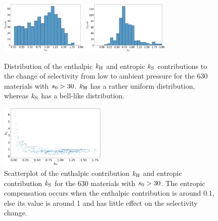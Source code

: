 \documentclass[main.tex]{subfiles}
\begin{document}
\begin{figure}[t]
  \centering
    \includegraphics[width=0.37\textwidth]{figures/2-thermo/k_H.jpg}
    \hspace{8mm}
    \includegraphics[width=0.37\textwidth]{figures/2-thermo/k_S.jpg}
    \caption{Distribution of the enthalpic $k_{\text{H}}$ and entropic $k_{\text{S}}$ contributions to the change of selectivity from low to ambient pressure for the 630 materials with $s_{\text{0}}>30$. $k_{\text{H}}$ has a rather uniform distribution, whereas $k_{\text{S}}$ has a bell-like distribution. }\label{fgr:distk}
\end{figure}

\begin{figure}[t]
\centering
  \includegraphics[width=0.45\textwidth]{figures/2-thermo/k_S_vs_k_H.jpg}
  \caption{Scatterplot of the enthalpic contribution $k_{\text{H}}$ and entropic contribution $k_{\text{S}}$ for the 630 materials with $s_{\text{0}}>30$. The entropic compensation occurs when the enthalpic contribution is around $0.1$, else its value is around 1 and has little effect on the selectivity change.}\label{fgr:scatterk}
\end{figure}
  
\end{document}

